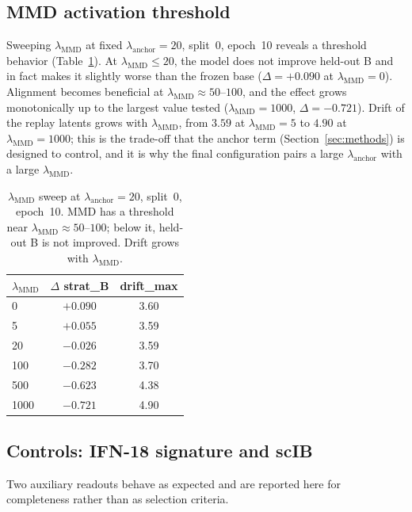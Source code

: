 \documentclass[12pt, a4paper]{article}
\begin{document}
\subsection{MMD activation threshold}

Sweeping \(\lambda_{\text{MMD}}\) at fixed
\(\lambda_{\text{anchor}}=20\), split~0, epoch~10 reveals a threshold
behavior (Table~\ref{tab:mmd-sweep}). At
\(\lambda_{\text{MMD}}\le 20\), the model does not improve held-out B and
in fact makes it slightly worse than the frozen base
(\(\Delta = +0.090\) at \(\lambda_{\text{MMD}}=0\)). Alignment becomes
beneficial at \(\lambda_{\text{MMD}}\approx 50\)--\(100\), and the effect
grows monotonically up to the largest value tested
(\(\lambda_{\text{MMD}}=1000\), \(\Delta = -0.721\)). Drift of the
replay latents grows with \(\lambda_{\text{MMD}}\), from \(3.59\) at
\(\lambda_{\text{MMD}}=5\) to \(4.90\) at \(\lambda_{\text{MMD}}=1000\);
this is the trade-off that the anchor term (Section~\ref{sec:methods})
is designed to control, and it is why the final configuration pairs a
large \(\lambda_{\text{anchor}}\) with a large
\(\lambda_{\text{MMD}}\).

\begin{table}[H]
\centering
\caption{\(\lambda_{\text{MMD}}\) sweep at \(\lambda_{\text{anchor}}=20\),
split~0, epoch~10. MMD has a threshold near
\(\lambda_{\text{MMD}}\approx 50\)--\(100\); below it, held-out B is not
improved. Drift grows with \(\lambda_{\text{MMD}}\).}
\label{tab:mmd-sweep}
\begin{tabular}{lcc}
\toprule
\(\lambda_{\text{MMD}}\) & \(\Delta\) strat\_B & drift\_max \\
\midrule
0    & \(+0.090\) & 3.60 \\
5    & \(+0.055\) & 3.59 \\
20   & \(-0.026\) & 3.59 \\
100  & \(-0.282\) & 3.70 \\
500  & \(-0.623\) & 4.38 \\
1000 & \(\mathbf{-0.721}\) & 4.90 \\
\bottomrule
\end{tabular}
\end{table}


\subsection{Controls: IFN-18 signature and scIB}

Two auxiliary readouts behave as expected and are reported here for
completeness rather than as selection criteria.
\end{document}
